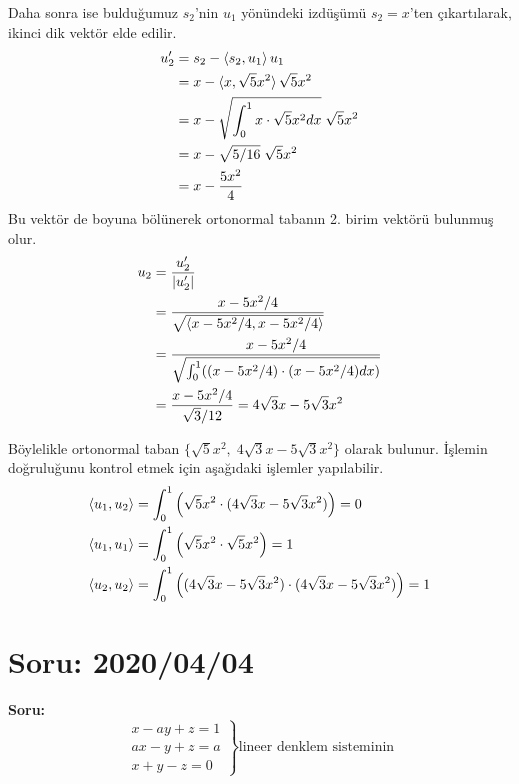\documentclass{article}
\numberwithin{equation}{section}
\begin{document}
Daha sonra ise bulduğumuz $s_2$'nin $u_1$ yönündeki izdüşümü $s_2 = x$'ten çıkartılarak, ikinci dik vektör elde edilir. 
%
\begin{align}
u_2^\prime &= s_2 - \braket{s_2,u_1} u_1 \nonumber \\
&= x - \braket{x, \sqrt{5}x^2} \sqrt{5}x^2 \nonumber \\
&= x - \sqrt{\int_{0}^{1}x\cdot \sqrt{5}x^2 dx} \; \sqrt{5}x^2 \nonumber \\
&= x - \sqrt{5/16} \; \sqrt{5}x^2 \nonumber \\
&= x - \frac{5x^2}{4} 
\end{align}
%
Bu vektör de boyuna bölünerek ortonormal tabanın 2. birim vektörü bulunmuş olur.
%
\begin{align}
u_2 &= \frac{u_2^\prime}{|u_2^\prime|} \nonumber\\
&= \frac{x - 5x^2/4 }{\sqrt{\braket{x - 5x^2/4,x - 5x^2/4}}}\nonumber \\
&= \frac{x - 5x^2/4}{\sqrt{\int_{0}^{1}((x - 5x^2/4)\cdot (x - 5x^2/4) dx)}} \nonumber \\
&= \frac{x - 5x^2/4}{\sqrt{3}/12} = 4\sqrt{3}x- 5\sqrt{3}x^2
\end{align}

Böylelikle ortonormal taban $\{\sqrt{5}x^2,\; 4\sqrt{3}x- 5\sqrt{3}x^2\}$ olarak bulunur. İşlemin doğruluğunu kontrol etmek için aşağıdaki işlemler yapılabilir. 
%
\begin{align}
\braket{u_1,u_2} &= \int_{0}^{1}\left(\sqrt{5}x^2 \cdot ( 4\sqrt{3}x- 5\sqrt{3}x^2)\right) = 0 \\ 
\braket{u_1,u_1} &= \int_{0}^{1}\left(\sqrt{5}x^2 \cdot \sqrt{5}x^2\right) = 1 \\ 
\braket{u_2,u_2} &= \int_{0}^{1}\left(( 4\sqrt{3}x- 5\sqrt{3}x^2) \cdot ( 4\sqrt{3}x- 5\sqrt{3}x^2)\right) = 1 
\end{align}
 
 

\section{Soru: 2020/04/04}
\textbf{Soru:}
$$
\left. \begin{array}{r}
x-ay +z = 1\\
ax - y +z =a \\
x + y -z = 0 
\end{array} \right\} \text{lineer denklem sisteminin}
$$
\end{document}
